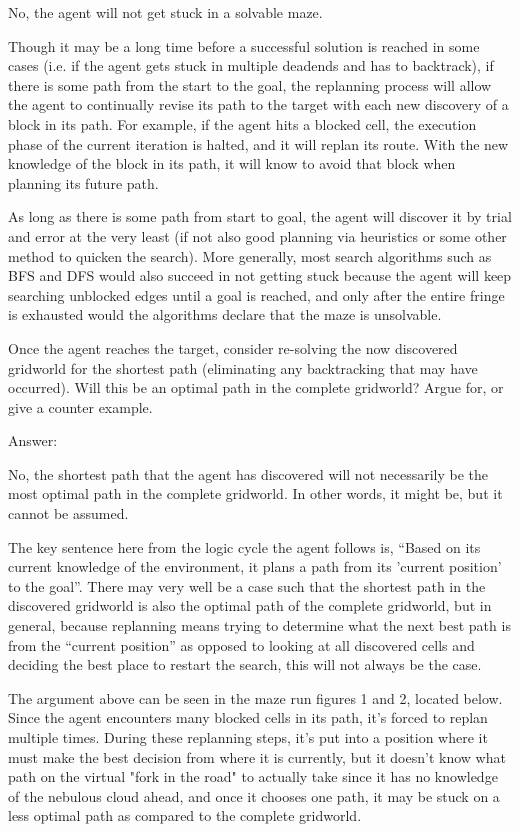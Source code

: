 \documentclass{homeworg}
\begin{document}
No, the agent will not get stuck in a solvable maze. 

Though it may be a long time before a successful solution is reached in some cases (i.e. if the agent gets stuck in multiple deadends and has to backtrack), if there is some path from the start to the goal, the replanning process will allow the agent to continually revise its path to the target with each new discovery of a block in its path. For example, if the agent hits a blocked cell, the execution phase of the current iteration is halted, and it will replan its route. With the new knowledge of the block in its path, it will know to avoid that block when planning its future path. 

As long as there is some path from start to goal, the agent will discover it by trial and error at the very least (if not also good planning via heuristics or some other method to quicken the search). More generally, most search algorithms such as BFS and DFS would also succeed in not getting stuck because the agent will keep searching unblocked edges until a goal is reached, and only after the entire fringe is exhausted would the algorithms declare that the maze is unsolvable.


\newpage
\exercise*
Once the agent reaches the target, consider re-solving the now discovered gridworld for the shortest path (eliminating any backtracking that may have occurred). Will this be an optimal path in the complete gridworld? Argue for, or give a counter example.

Answer:

No, the shortest path that the agent has discovered will not necessarily be the most optimal path in the complete gridworld. In other words, it might be, but it cannot be assumed.

The key sentence here from the logic cycle the agent follows is, “Based on its current knowledge of the environment, it plans a path from its 'current position' to the goal”. There may very well be a case such that the shortest path in the discovered gridworld is also the optimal path of the complete gridworld, but in general, because replanning means trying to determine what the next best path is from the “current position” as opposed to looking at all discovered cells and deciding the best place to restart the search, this will not always be the case.

The argument above can be seen in the maze run figures 1 and 2, located below. Since the agent encounters many blocked cells in its path, it's forced to replan multiple times. During these replanning steps, it's put into a position where it must make the best decision from where it is currently, but it doesn't know what path on the virtual "fork in the road" to actually take since it has no knowledge of the nebulous cloud ahead, and once it chooses one path, it may be stuck on a less optimal path as compared to the complete gridworld.
\end{document}

